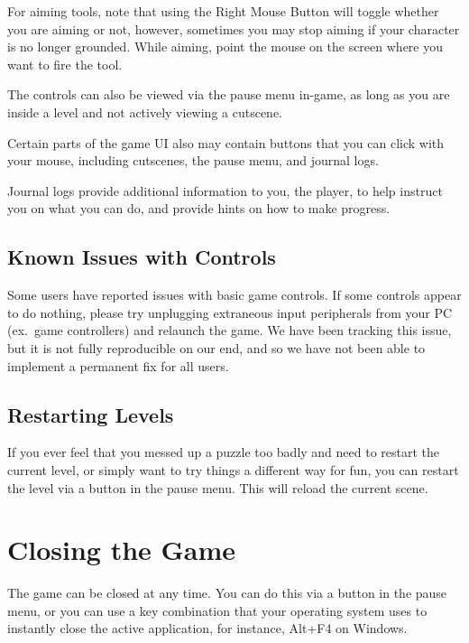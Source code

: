 \documentclass{article}
\begin{document}
For aiming tools, note that using the Right Mouse Button will toggle whether you are aiming or not,
however, sometimes you may stop aiming if your character is no longer grounded. While aiming,
point the mouse on the screen where you want to fire the tool.

The controls can also be viewed via the pause menu in-game, as long as you are inside
a level and not actively viewing a cutscene.

Certain parts of the game UI also may contain buttons that you can click with your mouse,
including cutscenes, the pause menu, and journal logs.

Journal logs provide additional information to you, the player, to help instruct you on what
you can do, and provide hints on how to make progress.

\subsection{Known Issues with Controls}
Some users have reported issues with basic game controls. If some controls appear to do nothing,
please try unplugging extraneous input peripherals from your PC (ex.\ game controllers) and relaunch
the game. We have been tracking this issue, but it is not fully reproducible on our end, and so
we have not been able to implement a permanent fix for all users.

\subsection{Restarting Levels}
If you ever feel that you messed up a puzzle too badly and need to restart the current level,
or simply want to try things a different way for fun, you can restart the level via a button in
the pause menu. This will reload the current scene.

\section{Closing the Game}
The game can be closed at any time. You can do this via a button in the pause menu, or 
you can use a key combination that your operating system uses to instantly close the active application,
for instance, Alt+F4 on Windows.
\end{document}
